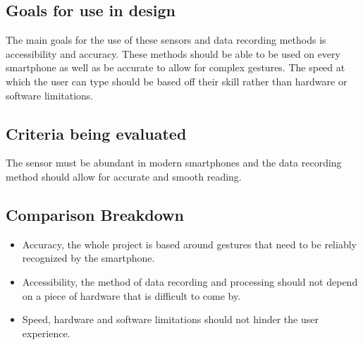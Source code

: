 \documentclass[onecolumn, draftclsnofoot,10pt, journal, letterpaper]{IEEEtran}
\begin{document}
    \subsection{Goals for use in design}
        The main goals for the use of these sensors and data recording methods is accessibility and accuracy. These methods should be able to be used on every smartphone as well as be accurate to allow for complex gestures. The speed at which the user can type should be based off their skill rather than hardware or software limitations. 
    \subsection{Criteria being evaluated }
        The sensor must be abundant in modern smartphones and the data recording method should allow for accurate and smooth reading. 
    \subsection{Comparison Breakdown}
        \begin{itemize}
            \item Accuracy, the whole project is based around gestures that need to be reliably recognized by the smartphone.
            \item Accessibility, the method of data recording and processing should not depend on a piece of hardware that is difficult to come by.
            \item Speed, hardware and software limitations should not hinder the user experience.
        \end{itemize}
        
\end{document}
